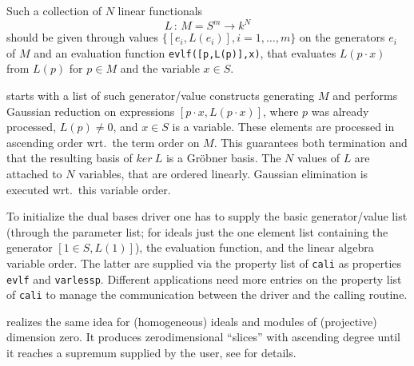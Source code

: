 Such a collection of $N$ linear functionals
\[L\,:\, M=S^m \longrightarrow k^N\]
should be given through values $\{[e_i,L(e_i)], i=1,\ldots,m\}$ on the
generators $e_i$ of $M$ and an evaluation function \texttt{evlf([p,L(p)],x)},
that evaluates $L(p\cdot x)$ from $L(p)$ for $p\in
M$ and the variable $x\in S$.

 starts with a list of such generator/value constructs
generating $M$ and performs Gaussian reduction on expressions $[p\cdot
x,L(p\cdot x)]$, where $p$ was already processed, $L(p)\neq 0$, and
$x\in S$ is a variable. These elements are processed in ascending order
wrt.\ the term order on $M$. This guarantees both termination and that
the resulting basis of $ker\ L$ is a Gr\"obner basis. The $N$ values of $L$
are attached to $N$ variables, that are ordered linearly. Gaussian
elimination is executed wrt.\ this variable order.

To initialize the dual bases driver one has to supply the basic
generator/value list (through the parameter list; for ideals just the
one element list containing the generator $[1\in S,L(1)]$), the
evaluation function, and the linear algebra variable order. The latter
are supplied via the property list of \texttt{cali} as properties \texttt{evlf}
and \texttt{varlessp}. Different applications need more entries
on the property list of \texttt{cali} to manage the communication between
the driver and the calling routine.

 realizes the same idea for (homogeneous) ideals and
modules of (projective) dimension zero. It produces zerodimensional
``slices'' with ascending degree until it reaches a supremum supplied
by the user, see \cite{Marinari:91} for details.
\medskip

